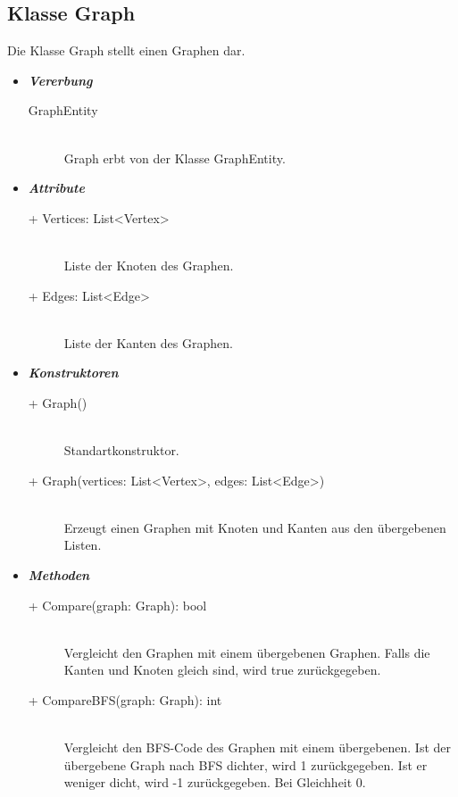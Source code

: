 \documentclass[13pt]{scrreprt}
\begin{document}
	\subsection{Klasse Graph}
	Die Klasse Graph stellt einen Graphen dar.
	\begin{itemize}[label = {$\circ$}]
		\item {\large \textbf{\textit{Vererbung}}\par}
		\begin{description}
			\item [GraphEntity] \hfill \\ Graph erbt von der Klasse GraphEntity.
		\end{description}
		\item {\large \textbf{\textit{Attribute}}\par}
		\begin{description}
			\item [+ Vertices: List<Vertex>] \hfill \\Liste der Knoten des Graphen.
			\item [+ Edges: List<Edge>] \hfill \\Liste der Kanten des Graphen.
		\end{description}
		\item {\large \textbf{\textit{Konstruktoren}}\par}
		\begin{description}
			\item [+ Graph()] \hfill \\ Standartkonstruktor.
			\item [+ Graph(vertices: List<Vertex>, edges: List<Edge>)] \hfill  \\ Erzeugt einen Graphen mit Knoten und Kanten aus den übergebenen Listen.
		\end{description}
	\newpage
		\item {\large \textbf{\textit{Methoden}}\par}
		\begin{description}
			\item [+ Compare(graph: Graph): bool] \hfill \\ Vergleicht den Graphen mit einem übergebenen Graphen. Falls die Kanten und Knoten gleich sind, wird true zurückgegeben.
			\item [+ CompareBFS(graph: Graph): int] \hfill \\ Vergleicht den BFS-Code des Graphen mit einem übergebenen. Ist der übergebene Graph nach BFS dichter, wird 1 zurückgegeben. Ist er weniger dicht, wird -1 zurückgegeben. Bei Gleichheit 0.

\end{description}
\end{itemize}
\end{document}
